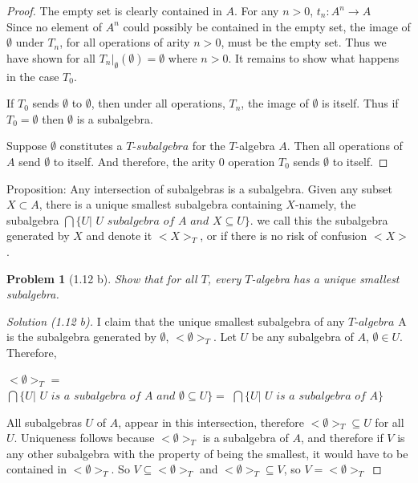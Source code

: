 \documentclass{article}
\theoremstyle{problemstyle}
\newtheorem{problem}{Problem}
\begin{document}
\begin{proof}
The empty set is clearly contained in $A$. For any $n > 0$,
$t_n: A^n \rightarrow A$ \\Since no element of $A^n$ could possibly be contained in the empty set, 
the image of $\emptyset$ under $T_n$, for all operations of arity $n >0$, must be the empty set. Thus we have shown for all $T_n|_{\emptyset}(\emptyset) = \emptyset$ where $n > 0$.  It remains to show what happens in the case $T_0$.

If $T_0$ sends $\emptyset$ to $\emptyset$, then under all operations, $T_n$, the image of $\emptyset$ is itself. Thus if $T_{0} = \emptyset$ then $\emptyset$ is a subalgebra.

Suppose $\emptyset$ constitutes a $T$-$subalgebra$ for the $T$-algebra $A$. Then all operations of $A$ send $\emptyset$ to itself. And therefore, the arity $0$ operation $T_0$ sends $\emptyset$ to itself. 
\end{proof}

\begin{flushleft}
Proposition: Any intersection of subalgebras is a subalgebra. Given any subset $X \subset A$, there is a unique smallest subalgebra containing $X$-namely, the subalgebra $\bigcap\{U|$ $U$ $subalgebra$ $of$ $A$ $and$ $X\subseteq U\}$. we call this the subalgebra generated by $X$ and denote it $<X>_T$, or if there is no risk of confusion $<X>$. 
\end{flushleft}

\begin{problem}[1.12 b] 
Show that for all $T$, every $T$-algebra has a unique smallest subalgebra. 
\end{problem}
\begin{proof}[Solution (1.12 b)] 
I claim that the unique smallest subalgebra of any $T$-$algebra$ A is the subalgebra generated by $\emptyset$, $<\emptyset>_T$. Let $U$ be any subalgebra of $A$, $\emptyset \in U$. Therefore, 

$<\emptyset>_T$ =  \\$\bigcap\{U|$ $U$ $is$ $a$ $subalgebra$ $of$ $A$ $and$ $\emptyset \subseteq U\} =$ $\bigcap\{U|$ $U$ $is$ $a$ $subalgebra$ $of$ $A\}$  

All subalgebras $U$ of $A$, appear in this intersection, therefore $<\emptyset>_T \subseteq U$ for all $U$. Uniqueness follows because $<\emptyset>_T$ is a subalgebra of $A$, and therefore if $V$ is any other subalgebra with the property of being the smallest, it would have to be contained in $<\emptyset>_T$. So $V \subseteq <\emptyset>_T$ and $<\emptyset>_T \subseteq V$, so $V  = <\emptyset>_T$
\end{proof}
\end{document}
